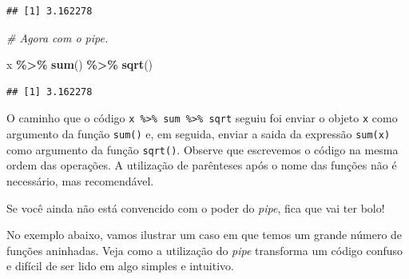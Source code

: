 \documentclass[
]{book}
\newenvironment{Shaded}{\begin{snugshade}}{\end{snugshade}}
\newcommand{\CommentTok}[1]{\textcolor[rgb]{0.56,0.35,0.01}{\textit{#1}}}
\newcommand{\KeywordTok}[1]{\textcolor[rgb]{0.13,0.29,0.53}{\textbf{#1}}}
\newcommand{\NormalTok}[1]{#1}
\newcommand{\OperatorTok}[1]{\textcolor[rgb]{0.81,0.36,0.00}{\textbf{#1}}}
\newcommand{\StringTok}[1]{\textcolor[rgb]{0.31,0.60,0.02}{#1}}
\begin{document}
\begin{verbatim}
## [1] 3.162278
\end{verbatim}

\begin{Shaded}
\begin{Highlighting}[]
\CommentTok{\# Agora com o pipe.}

\NormalTok{x }\OperatorTok{\%>\%}\StringTok{ }\KeywordTok{sum}\NormalTok{() }\OperatorTok{\%>\%}\StringTok{ }\KeywordTok{sqrt}\NormalTok{()}
\end{Highlighting}
\end{Shaded}

\begin{verbatim}
## [1] 3.162278
\end{verbatim}

O caminho que o código \texttt{x\ \%\textgreater{}\%\ sum\ \%\textgreater{}\%\ sqrt} seguiu foi enviar o objeto \texttt{x} como argumento da função \texttt{sum()} e, em seguida, enviar a saida da expressão \texttt{sum(x)} como argumento da função \texttt{sqrt()}. Observe que escrevemos o código na mesma ordem das operações. A utilização de parênteses após o nome das funções não é necessário, mas recomendável.

Se você ainda não está convencido com o poder do \emph{pipe}, fica que vai ter bolo!

No exemplo abaixo, vamos ilustrar um caso em que temos um grande número de funções aninhadas. Veja como a utilização do \emph{pipe} transforma um código confuso e difícil de ser lido em algo simples e intuitivo.
\end{document}
